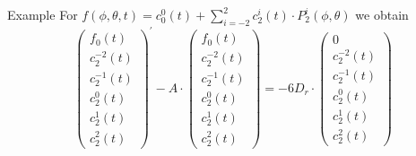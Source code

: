 \begin{frame}{Example}
	\scriptsize
	For  $f(\phi, \theta, t) = c^0_0(t) + \sum_{i=-2}^{2} c^i_{2}(t) \cdot P^i_{2}(\phi, \theta)$ we obtain
		\begin{equation}
		\left(\begin{array}{c}
			f_0(t) \\
			c_2^{-2}(t) \\
			c_2^{-1}(t) \\
			c_2^0(t) \\
			c_2^1(t) \\
			c_2^2(t)
		\end{array}\right)^{\prime} - A \cdot
		\left(\begin{array}{c}
			f_0(t) \\
			c_2^{-2}(t) \\
			c_2^{-1}(t) \\
			c_2^0(t) \\
			c_2^1(t) \\
			c_2^2(t)
		\end{array}\right) = -6 D_r \cdot
		\left(\begin{array}{c}
			0 \\
			c^{-2}_2(t) \\
			c_2^{-1}(t) \\
			c_2^0(t) \\
			c_2^1(t) \\
			c_2^2(t)
		\end{array}\right)
	\end{equation}
\end{frame}




